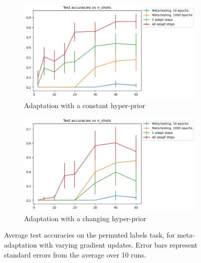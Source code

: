 \documentclass[letterpaper]{article} %
\theoremstyle{definition}
\begin{document}
\begin{figure}[ht!]
	\centering
	\begin{subfigure}[b]{0.45\textwidth}
		\centering
		\includegraphics[width=\textwidth]{test_accuracies_labels_const}
		\caption{Adaptation with a constant hyper-prior}
	\end{subfigure}
	\hfill
	\begin{subfigure}[b]{0.45\textwidth}
		\centering
		\includegraphics[width=\textwidth]{test_accuracies_labels_var}
		\caption{Adaptation with a changing hyper-prior}	 	
	\end{subfigure}
	\hfill
	\caption{Average test accuracies on the permuted labels task, for meta-adaptation with varying gradient updates. Error bars represent standard errors from the average over 10 runs.}	 
	\label{fig:results-labels}
\end{figure}
\end{document}
